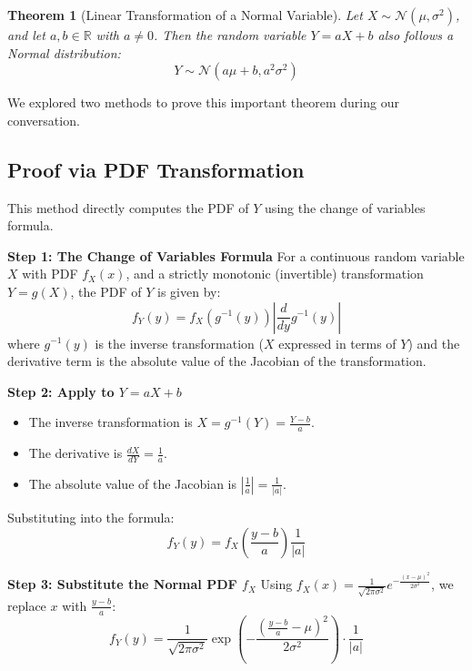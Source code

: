 \documentclass[11pt, letterpaper]{article}
\newtheorem{theorem}{Theorem}[section]
\theoremstyle{definition}
\theoremstyle{remark}
\begin{document}
\begin{theorem}[Linear Transformation of a Normal Variable]
Let $X \sim \mathcal{N}(\mu, \sigma^2)$, and let $a, b \in \mathbb{R}$ with $a \neq 0$. Then the random variable $Y = aX + b$ also follows a Normal distribution:
\begin{equation}
    Y \sim \mathcal{N}(a\mu + b, a^2\sigma^2)
\end{equation}
\end{theorem}

We explored two methods to prove this important theorem during our conversation.

\subsection{Proof via PDF Transformation}

This method directly computes the PDF of $Y$ using the change of variables formula.

\textbf{Step 1: The Change of Variables Formula}
For a continuous random variable $X$ with PDF $f_X(x)$, and a strictly monotonic (invertible) transformation $Y=g(X)$, the PDF of $Y$ is given by:
$$ f_Y(y) = f_X(g^{-1}(y)) \left| \frac{d}{dy} g^{-1}(y) \right| $$
where $g^{-1}(y)$ is the inverse transformation ($X$ expressed in terms of $Y$) and the derivative term is the absolute value of the Jacobian of the transformation.

\textbf{Step 2: Apply to $Y = aX+b$}
\begin{itemize}
    \item The inverse transformation is $X = g^{-1}(Y) = \frac{Y-b}{a}$.
    \item The derivative is $\frac{dX}{dY} = \frac{1}{a}$.
    \item The absolute value of the Jacobian is $\left| \frac{1}{a} \right| = \frac{1}{|a|}$.
\end{itemize}
Substituting into the formula:
$$ f_Y(y) = f_X\left( \frac{y-b}{a} \right) \frac{1}{|a|} $$

\textbf{Step 3: Substitute the Normal PDF $f_X$}
Using $f_X(x) = \frac{1}{\sqrt{2 \pi \sigma^2}} e^{-\frac{(x-\mu)^2}{2 \sigma^2}}$, we replace $x$ with $\frac{y-b}{a}$:
$$ f_Y(y) = \frac{1}{\sqrt{2 \pi \sigma^2}} \exp\left( -\frac{\left(\frac{y-b}{a} - \mu\right)^2}{2 \sigma^2} \right) \cdot \frac{1}{|a|} $$
\end{document}
